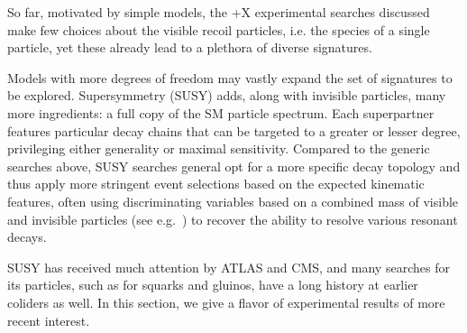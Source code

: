 

So far, motivated by simple models, the \MET+X experimental searches discussed make few choices about the visible recoil particles, i.e. the species of a single particle, yet these already lead to a plethora of diverse signatures.

Models with more degrees of freedom may vastly expand the set of signatures to be explored.
Supersymmetry (SUSY) adds, along with invisible particles, many more ingredients: a full copy of the SM particle spectrum.
Each superpartner features particular decay chains that can be targeted to a greater or lesser degree, privileging either generality or maximal sensitivity. 
Compared to the generic searches above, SUSY searches general opt for a more specific decay topology and thus apply more stringent event selections based on the expected kinematic features, often using discriminating variables based on a combined mass of visible and invisible particles (see e.g.~\cite{Lester:1999tx}) to recover the ability to resolve various resonant decays.

SUSY has received much attention by ATLAS and CMS, and many searches for its particles, such as for squarks and gluinos, have a long history at earlier coliders as well.
In this section, we give a flavor of experimental results of more recent interest.


